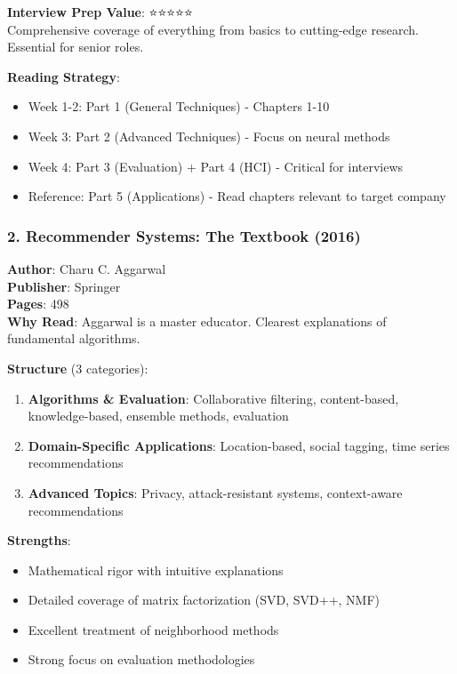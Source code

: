 \documentclass[10pt]{article}
\begin{document}
\textbf{Interview Prep Value}: ⭐⭐⭐⭐⭐ \\
Comprehensive coverage of everything from basics to cutting-edge research. Essential for senior roles.

\textbf{Reading Strategy}:
\begin{itemize}[leftmargin=*]
    \item Week 1-2: Part 1 (General Techniques) - Chapters 1-10
    \item Week 3: Part 2 (Advanced Techniques) - Focus on neural methods
    \item Week 4: Part 3 (Evaluation) + Part 4 (HCI) - Critical for interviews
    \item Reference: Part 5 (Applications) - Read chapters relevant to target company
\end{itemize}

\subsubsection*{2. Recommender Systems: The Textbook (2016)}
\textbf{Author}: Charu C. Aggarwal \\
\textbf{Publisher}: Springer \\
\textbf{Pages}: 498 \\
\textbf{Why Read}: Aggarwal is a master educator. Clearest explanations of fundamental algorithms.

\textbf{Structure} (3 categories):
\begin{enumerate}[leftmargin=*]
    \item \textbf{Algorithms \& Evaluation}: Collaborative filtering, content-based, knowledge-based, ensemble methods, evaluation
    \item \textbf{Domain-Specific Applications}: Location-based, social tagging, time series recommendations
    \item \textbf{Advanced Topics}: Privacy, attack-resistant systems, context-aware recommendations
\end{enumerate}

\textbf{Strengths}:
\begin{itemize}[leftmargin=*]
    \item Mathematical rigor with intuitive explanations
    \item Detailed coverage of matrix factorization (SVD, SVD++, NMF)
    \item Excellent treatment of neighborhood methods
    \item Strong focus on evaluation methodologies
\end{itemize}
\end{document}
